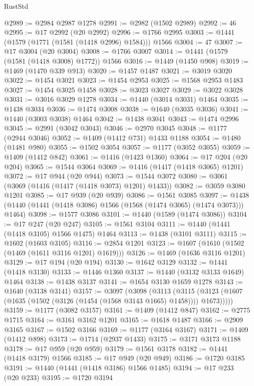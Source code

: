 \begin{lexlean}{RustStd}
\begin{coremodule}
{\begin{coremodule}
{{{{{{{{{{{{{{{{{{{{{{{{{{{{{{{@2989 := @2984 @2987 @1278
@2991 := @2982 (@1502 @2989)
@2992 := 46
@2995 := @17 @2992 (@20 @2992)
@2996 := @1766 @2995
@3003 := @1441 (@1579 (@1771 (@1581 (@1418 @2996) @1584))) @1566
@3004 := 47
@3007 := @17 @3004 (@20 @3004)
@3008 := @1766 @3007
@3014 := @1441 (@1579 (@1581 (@1418 @3008) @1772)) @1566
@3016 := @1449 (@1450 @908)
@3019 := @1469 (@1470 @339 @913)
@3020 := @1457 @1487
@3021 := @3019 @3020
@3022 := @1454 @3021
@3023 := @1454 @2953
@3025 := @1568 @2953 @1483
@3027 := @1454 @3025 @1458
@3028 := @3023 @3027
@3029 := @3022 @3028
@3031 := @3016 @3029 @1278
@3034 := @1440 (@3014 @3031) @1464
@3035 := @1438 @3034
@3036 := @1474 @3008
@3038 := @1640 (@3035 @3036)
@3041 := @1440 (@3003 @3038) @1464
@3042 := @1438 @3041
@3043 := @1474 @2996
@3045 := @2991 (@3042 @3043)
@3046 := @2970 @3045
@3048 := @1177 (@2944 @3046)
@3052 := @1409 (@1412 @731) @1433 @1188
@3054 := @1480 (@1481 @980)
@3055 := @1502 @3054
@3057 := @1177 (@3052 @3055)
@3059 := @1409 (@1412 @842)
@3061 := @1416 (@1423 @1360)
@3064 := @17 @204 (@20 @204)
@3065 := @1544 @3064
@3069 := @1416 (@1417 (@1418 @3065) @1201)
@3072 := @17 @944 (@20 @944)
@3073 := @1544 @3072
@3080 := @3061 (@3069 (@1416 (@1417 (@1418 @3073) @1201) @1433))
@3082 := @3059 @3080 @1201
@3085 := @17 @939 (@20 @939)
@3086 := @1561 @3085
@3097 := @1438 (@1440 (@1441 (@1418 @3086) @1566 (@1568 (@1474 @3065) (@1474 @3073))) @1464)
@3098 := @1577 @3086
@3101 := @1440 (@1589 (@1474 @3086))
@3104 := @17 @247 (@20 @247)
@3105 := @1561 @3104
@3111 := @1440 (@1441 (@1418 @3105) @1566 @1475) @1464
@3113 := @1438 (@3101 @3111)
@3115 := @1602 (@1603 @3105)
@3116 := @2854 @1201
@3123 := @1607 (@1610 (@1502 (@1469 (@1611 @3116 @1201) @1619)))
@3126 := @1469 (@1636 @3116 @1201)
@3129 := @17 @194 (@20 @194)
@3130 := @1642 @3129
@3132 := @1441 (@1418 @3130)
@3133 := @1446 @1360
@3137 := @1440 (@3132 @3133 @1649) @1464
@3138 := @1438 @3137
@3141 := @1654 @3130 @1659 @1278
@3143 := @1640 (@3138 @3141)
@3157 := @3097
    (@3098
      (@3113
        (@3115 (@3123 (@1607 (@1635 (@1502 (@3126 (@1454 (@1568 @3143 @1665) @1458)))) @1673)))))
@3159 := @1177 (@3082 @3157)
@3161 := @1409 (@1412 @847)
@3162 := @2775 @1715
@3164 := @3161 @3162 @1201
@3165 := @1618 @1487
@3166 := @2909 @3165
@3167 := @1502 @3166
@3169 := @1177 (@3164 @3167)
@3171 := @1409 (@1412 @898)
@3173 := @1714 (@2937 @1433)
@3175 := @3171 @3173 @1188
@3178 := @17 @959 (@20 @959)
@3179 := @1561 @3178
@3182 := @1441 (@1418 @3179) @1566
@3185 := @17 @949 (@20 @949)
@3186 := @1720 @3185
@3191 := @1440 (@1441 (@1418 @3186) @1566 @1485)
@3194 := @17 @233 (@20 @233)
@3195 := @1720 @3194
}}}}}}}}}}}}}}}}}}}}}}}}}}}}}}}
\end{coremodule}}
\end{coremodule}
\end{lexlean}
